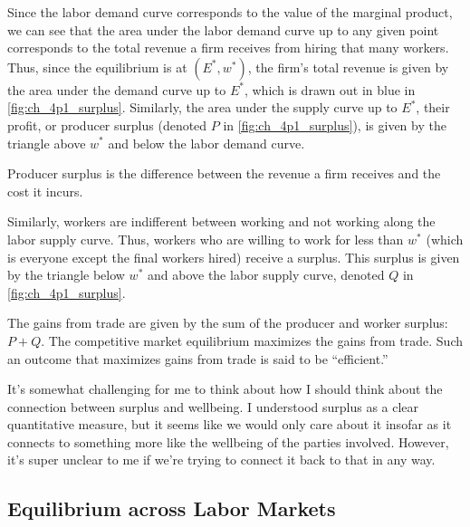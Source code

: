 \FloatBarrier

Since the labor demand curve corresponds to the value of 
the marginal product, we can see that the area under the labor 
demand curve up to any given point corresponds to the total revenue
a firm receives from hiring that many workers.
Thus, since the equilibrium is at $(E^*, w^*)$, the
firm's total revenue is given by the area under the demand 
curve up to $E^*$, which is drawn out 
in blue in \autoref{fig:ch_4p1_surplus}.
Similarly, the area under the supply curve up to $E^*$,
their profit, or producer surplus (denoted $P$ in \autoref{fig:ch_4p1_surplus}), is 
given by the triangle above $w^*$ and below the labor 
demand curve.

\begin{definition} 

    Producer surplus is the difference between the 
    revenue a firm receives and the cost it incurs.
    
\end{definition}

Similarly, workers are indifferent between working and not working 
along the labor supply curve. Thus, workers who are 
willing to work for less than $w^*$ (which is everyone 
except the final workers hired) receive a surplus.
This surplus is given by the triangle below $w^*$ and
above the labor supply curve, denoted $Q$ in 
\autoref{fig:ch_4p1_surplus}.

The gains from trade are given by the sum of the
producer and worker surplus: $P + Q$.
The competitive market equilibrium maximizes the 
gains from trade. Such an outcome that maximizes 
gains from trade is said to be ``efficient.''

\begin{questions}
    It's somewhat challenging for me to think about 
    how I should think about the connection between surplus 
    and wellbeing. I understood surplus as a clear quantitative 
    measure, but it seems like we would only care about it insofar as it 
    connects to something more like the wellbeing of the parties 
    involved. However, it's super unclear to me 
    if we're trying to connect it back to that 
    in any way.
\end{questions}

\subsection{Equilibrium across Labor Markets}

